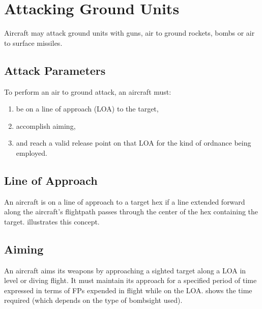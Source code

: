 
\section{Attacking Ground Units}

Aircraft may attack ground units with guns, air to ground rockets, bombs or air to surface missiles.

\subsection{Attack Parameters}
To perform an air to ground attack, an aircraft must:
\begin{enumerate}
\item[a)] be on a line of approach (LOA) to the target,
\item[b)] accomplish aiming,
\item[c)] and reach a valid release point on that LOA for the kind of ordnance being employed.
\end{enumerate}

\subsection{Line of Approach} An aircraft is on a line of approach to a target hex if a line extended forward along the aircraft's flightpath passes through the center of the hex containing the target.  illustrates this concept.




\subsection{Aiming} An aircraft aims its weapons by approaching a sighted target along a LOA in level or diving flight. It must maintain its approach for a specified period of time expressed in terms of FPs expended in flight while on the LOA.  shows the time required (which depends on the type of bombsight used). 

